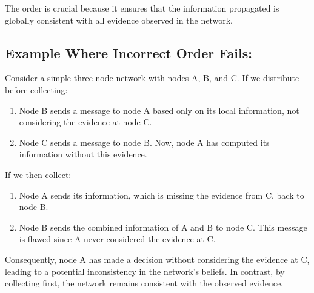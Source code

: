 \documentclass{article}
\begin{document}
The order is crucial because it ensures that the information propagated is globally consistent with all evidence observed in the network.

\subsection*{Example Where Incorrect Order Fails:}
Consider a simple three-node network with nodes A, B, and C. If we distribute before collecting:
\begin{enumerate}
    \item Node B sends a message to node A based only on its local information, not considering the evidence at node C.
    \item Node C sends a message to node B. Now, node A has computed its information without this evidence.
\end{enumerate}

If we then collect:
\begin{enumerate}
    \item Node A sends its information, which is missing the evidence from C, back to node B.
    \item Node B sends the combined information of A and B to node C. This message is flawed since A never considered the evidence at C.
\end{enumerate}

Consequently, node A has made a decision without considering the evidence at C, leading to a potential inconsistency in the network's beliefs. In contrast, by collecting first, the network remains consistent with the observed evidence.
\end{document}
